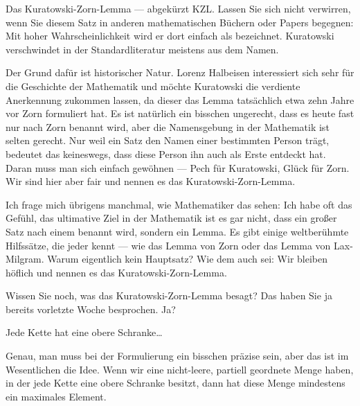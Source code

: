 \begin{spoken-clean}[00:59:10 - 01:00:26]
Das Kuratowski-Zorn-Lemma --- abgekürzt KZL. Lassen Sie sich nicht verwirren, wenn Sie diesem Satz in anderen mathematischen Büchern oder Papers begegnen: Mit hoher Wahrscheinlichkeit wird er dort einfach als  bezeichnet. Kuratowski verschwindet in der Standardliteratur meistens aus dem Namen.

Der Grund dafür ist historischer Natur. Lorenz Halbeisen interessiert sich sehr für die Geschichte der Mathematik und möchte Kuratowski die verdiente Anerkennung zukommen lassen, da dieser das Lemma tatsächlich etwa zehn Jahre vor Zorn formuliert hat. Es ist natürlich ein bisschen ungerecht, dass es heute fast nur nach Zorn benannt wird, aber die Namensgebung in der Mathematik ist selten gerecht. Nur weil ein Satz den Namen einer bestimmten Person trägt, bedeutet das keineswegs, dass diese Person ihn auch als Erste entdeckt hat. Daran muss man sich einfach gewöhnen --- Pech für Kuratowski, Glück für Zorn. Wir sind hier aber fair und nennen es das Kuratowski-Zorn-Lemma.

Ich frage mich übrigens manchmal, wie Mathematiker das sehen: Ich habe oft das Gefühl, das ultimative Ziel in der Mathematik ist es gar nicht, dass ein großer Satz nach einem benannt wird, sondern ein Lemma. Es gibt einige weltberühmte Hilfssätze, die jeder kennt --- wie das Lemma von Zorn oder das Lemma von Lax-Milgram. Warum eigentlich kein Hauptsatz? Wie dem auch sei: Wir bleiben höflich und nennen es das Kuratowski-Zorn-Lemma.
\end{spoken-clean}

\begin{spoken-clean}[01:00:26 - 01:00:45]
Wissen Sie noch, was das Kuratowski-Zorn-Lemma besagt? Das haben Sie ja bereits vorletzte Woche besprochen. Ja?
\end{spoken-clean}

\begin{student-interaction}[Studentenantwort]
Jede Kette hat eine obere Schranke\dots
\end{student-interaction}

\begin{spoken-clean}[01:00:45 - 01:01:39]
Genau, man muss bei der Formulierung ein bisschen präzise sein, aber das ist im Wesentlichen die Idee. Wenn wir eine nicht-leere, partiell geordnete Menge haben, in der jede Kette eine obere Schranke besitzt, dann hat diese Menge mindestens ein maximales Element.
\end{spoken-clean}

